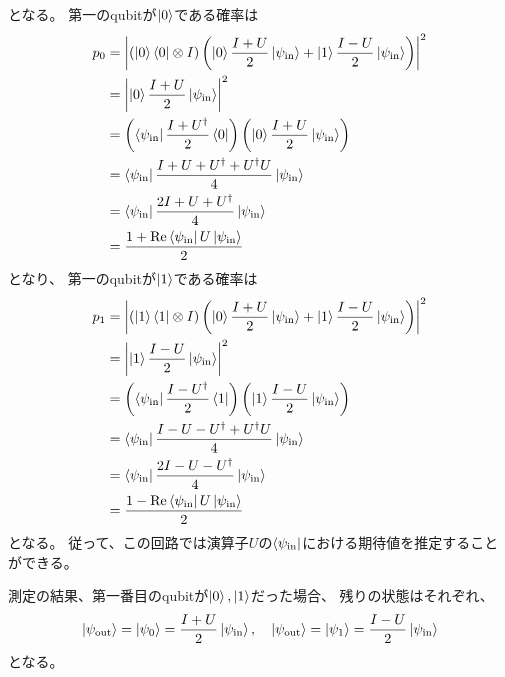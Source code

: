 \documentclass[]{ltjsarticle}
\renewcommand{\Re}{\mathrm{Re}}
\begin{document}
となる。
第一のqubitが$\ket{0}$である確率は
\begin{align}
    p_0
    &=
    \left|
        (\ket{0}\bra{0} \otimes I)
        \left(
            \ket{0}\frac{I + U}{2}\ket{\psi_\text{in}}
            +
            \ket{1}\frac{I - U}{2}\ket{\psi_\text{in}}
        \right)
    \right|^2 \\
    &=
    \left|
        \ket{0}\frac{I + U}{2}\ket{\psi_\text{in}}
    \right|^2 \\
    &=
    \left(
        \bra{\psi_\text{in}}\frac{I + U^\dagger}{2}\bra{0}
    \right)
    \left(
        \ket{0}\frac{I + U}{2}\ket{\psi_\text{in}}
    \right) \\
    &=
    \bra{\psi_\text{in}}
    \frac{I + U + U^\dagger + U^\dagger U}{4}
    \ket{\psi_\text{in}} \\
    &=
    \bra{\psi_\text{in}}
    \frac{2I + U + U^\dagger}{4}
    \ket{\psi_\text{in}} \\
    &=
    \frac{1 + \Re\bra{\psi_\text{in}}U\ket{\psi_\text{in}}}{2}
\end{align}
となり、
第一のqubitが$\ket{1}$である確率は
\begin{align}
    p_1
    &=
    \left|
        (\ket{1}\bra{1} \otimes I)
        \left(
            \ket{0}\frac{I + U}{2}\ket{\psi_\text{in}}
            +
            \ket{1}\frac{I - U}{2}\ket{\psi_\text{in}}
        \right)
    \right|^2 \\
    &=
    \left|
        \ket{1}\frac{I - U}{2}\ket{\psi_\text{in}}
    \right|^2 \\
    &=
    \left(
        \bra{\psi_\text{in}}\frac{I - U^\dagger}{2}\bra{1}
    \right)
    \left(
        \ket{1}\frac{I - U}{2}\ket{\psi_\text{in}}
    \right) \\
    &=
    \bra{\psi_\text{in}}
    \frac{I - U - U^\dagger + U^\dagger U}{4}
    \ket{\psi_\text{in}} \\
    &=
    \bra{\psi_\text{in}}
    \frac{2I - U - U^\dagger}{4}
    \ket{\psi_\text{in}} \\
    &=
    \frac{1 - \Re\bra{\psi_\text{in}}U\ket{\psi_\text{in}}}{2}
\end{align}
となる。
従って、この回路では演算子$U$の$\bra{\psi_\text{in}}$における期待値を推定することができる。

測定の結果、第一番目のqubitが$\ket{0}, \ket{1}$だった場合、
残りの状態はそれぞれ、
\begin{align}
    \ket{\psi_\text{out}}
    =
    \ket{\psi_0}
    =
    \frac{I + U}{2}
    \ket{\psi_\text{in}}, \quad
    \ket{\psi_\text{out}}
    =
    \ket{\psi_1}
    =
    \frac{I - U}{2}
    \ket{\psi_\text{in}}
\end{align}
となる。
\end{document}
